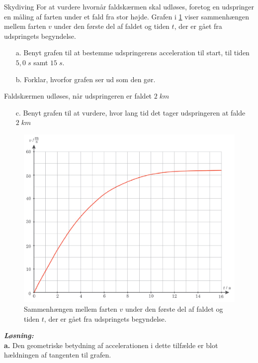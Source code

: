\documentclass{report}
\newcommand{\sol}{\setlength{\parindent}{0cm}\textbf{\textit{Løsning:}}\setlength{\parindent}{1cm}}
\begin{document}
\begin{question}{Skydiving}{}
For at vurdere hvornår faldskærmen skal udløses, foretog en udspringer en måling af farten under et fald fra stor højde. 
  Grafen i \cref{fig:2} viser sammenhængen mellem farten $v$ under den første del af faldet og tiden $t$, der er gået fra udspringets begyndelse.
\begin{itemize}
  \item[a.] Benyt grafen til at bestemme udspringerens acceleration til start, til tiden $5,0 \;\unit{s} $ samt $15 \;\unit{s} $.
  \item[b.] Forklar, hvorfor grafen ser ud som den gør.
\end{itemize}
Faldskærmen udløses, når udspringeren er faldet $2 \;\unit{km} $
\begin{itemize}
  \item[c.] Benyt grafen til at vurdere, hvor lang tid det tager udspringeren at falde $2 \;\unit{km} $
\end{itemize}
\end{question}
\pagebreak
\begin{figure}[h]
\begin{center}
  \includegraphics[scale=0.3]{H5_2.png}
\end{center}
\caption{Sammenhængen mellem farten $v$ under den første del af faldet og tiden $t$, der er gået fra udspringets begyndelse.}
\label{fig:2}
\end{figure}
\sol \\ 
\textbf{a.} Den geometriske betydning af accelerationen i dette tilfælde er blot hældningen af tangenten til grafen. 
\end{document}
